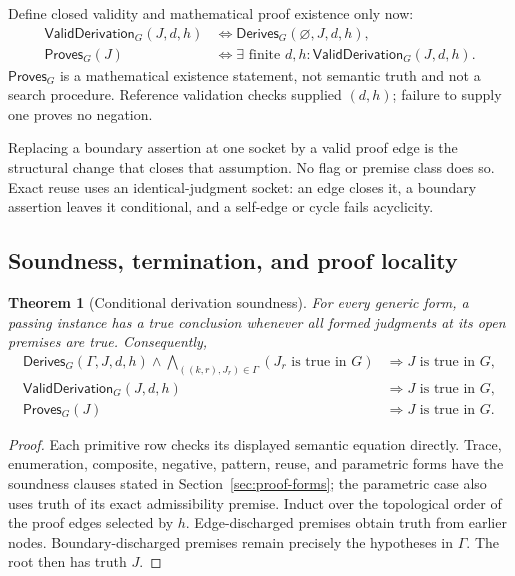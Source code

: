 \documentclass[11pt,twoside]{article}
\newcommand{\Proves}{\mathsf{Proves}}
\newcommand{\Derives}{\mathsf{Derives}}
\newcommand{\ValidDerivation}{\mathsf{ValidDerivation}}
\newtheorem{theorem}{Theorem}
\begin{document}
Define closed validity and mathematical proof existence only now:
\[
\begin{split}
 \ValidDerivation_G(J,d,h)
 &\Longleftrightarrow \Derives_G(\varnothing,J,d,h),\\
 \Proves_G(J)
 &\Longleftrightarrow
 \exists\text{ finite }d,h:\ValidDerivation_G(J,d,h).
\end{split}
\]
\(\Proves_G\) is a mathematical existence statement, not semantic truth and not a
search procedure.  Reference validation checks supplied \((d,h)\); failure to
supply one proves no negation.

Replacing a boundary assertion at one socket by a valid proof edge is the
structural change that closes that assumption.  No flag or premise class does so.
Exact reuse uses an identical-judgment socket: an edge closes it, a boundary
assertion leaves it conditional, and a self-edge or cycle fails acyclicity.

\subsection{Soundness, termination, and proof locality}

\begin{theorem}[Conditional derivation soundness]\label{thm:derivation-soundness}
For every generic form, a passing instance has a true conclusion whenever all
formed judgments at its open premises are true.  Consequently,
\[
\begin{split}
 \Derives_G(\Gamma,J,d,h)
 \land
 \bigwedge_{((k,r),J_r)\in\Gamma}
       (J_r\text{ is true in }G)
 &\Longrightarrow J\text{ is true in }G,\\
 \ValidDerivation_G(J,d,h)
 &\Longrightarrow J\text{ is true in }G,\\
 \Proves_G(J)
 &\Longrightarrow J\text{ is true in }G.
\end{split}
\]
\end{theorem}

\begin{proof}
Each primitive row checks its displayed semantic equation directly.  Trace,
enumeration, composite, negative, pattern, reuse, and parametric forms have the
soundness clauses stated in Section~\ref{sec:proof-forms}; the parametric case also
uses truth of its exact admissibility premise.  Induct over the topological order of
the proof edges selected by \(h\).  Edge-discharged premises obtain truth from
earlier nodes.  Boundary-discharged premises remain precisely the hypotheses in
\(\Gamma\).  The root then has truth \(J\).
\end{proof}
\end{document}
